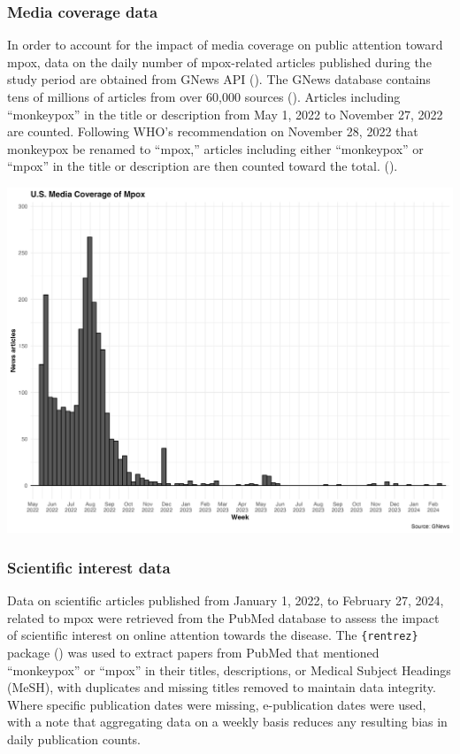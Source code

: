 \documentclass[
  12pt,
]{article}
\begin{document}
\subsubsection{Media coverage data}\label{media-coverage-data}

In order to account for the impact of media coverage on public attention
toward mpox, data on the daily number of mpox-related articles published
during the study period are obtained from GNews API
(). The GNews database contains tens of millions of articles
from over 60,000 sources (). Articles including
``monkeypox'' in the title or description from May 1, 2022 to November
27, 2022 are counted. Following WHO's recommendation on November 28,
2022 that monkeypox be renamed to ``mpox,'' articles including either
``monkeypox'' or ``mpox'' in the title or description are then counted
toward the total. ().

\includegraphics{images/mpox-news.png}\\

\subsubsection{Scientific interest data}\label{scientific-interest-data}

Data on scientific articles published from January 1, 2022, to February
27, 2024, related to mpox were retrieved from the PubMed database to
assess the impact of scientific interest on online attention towards the
disease. The \texttt{\{rentrez\}} package
() was
used to extract papers from PubMed that mentioned ``monkeypox'' or
``mpox'' in their titles, descriptions, or Medical Subject Headings
(MeSH), with duplicates and missing titles removed to maintain data
integrity. Where specific publication dates were missing, e-publication
dates were used, with a note that aggregating data on a weekly basis
reduces any resulting bias in daily publication counts.
\end{document}
